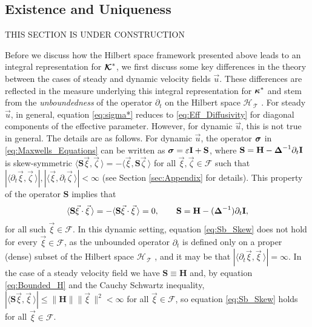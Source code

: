 \documentclass[11pt]{amsart}
\newcommand{\Hb}{\mathbf{H}}
\newcommand{\Ib}{\mathbf{I}}
\newcommand{\Sb}{\mathbf{S}}
\newcommand\Kbc{\mbox{\boldmath${\mathcal{K}}$}}
\newcommand{\Tc}{\mathcal{T}}
\newcommand{\Hs}{\mathscr{H}}
\newcommand{\Fs}{\mathscr{F}}
\newcommand\bsig{\mbox{\boldmath${\sigma}$}}
\newcommand\bDelta{\mbox{\boldmath${\Delta}$}}
\newcommand\bkappa{\mbox{\boldmath${\kappa}$}}
\begin{document}
\subsection{Existence and Uniqueness}\label{sec:Existance!}
%
THIS SECTION IS UNDER CONSTRUCTION

Before we discuss how the Hilbert space framework presented above
leads to an  integral representation for $\Kbc^*$, we first discuss
some key differences in the theory between the cases of steady 
and dynamic velocity fields $\vec{u}$. These differences are reflected
in the measure underlying this integral representation for $\bkappa^*$
and stem from the \emph{unboundedness} of the operator $\partial_t$ on the
Hilbert space $\Hs_{\,\Tc}$ \cite{Reed-1980,Stone:64}. For steady
$\vec{u}$, in general, equation \eqref{eq:sigma*} reduces to
\eqref{eq:Eff_Diffusivity} for  diagonal components of the effective
parameter.  However, for dynamic $\vec{u}$, this is not true in
general. The details are as follows. For dynamic $\vec{u}$, the
operator $\bsig$ in \eqref{eq:Maxwells_Equations} can be written as
$\bsig=\varepsilon\Ib+\Sb$, where  $\Sb=\Hb-\bDelta^{-1}\partial_t\Ib$ is skew-symmetric 
$\langle\Sb\vec{\xi},\vec{\zeta}\,\rangle=-\langle\vec{\xi},\Sb\vec{\zeta}\,\rangle$ for all
$\vec{\xi},\vec{\zeta}\in\Fs$ such that
$|\langle\partial_t\vec{\xi},\vec{\zeta}\,\rangle|,|\langle\vec{\xi},\partial_t\vec{\zeta}\,\rangle|<\infty$ (see Section
\ref{sec:Appendix} for details).  
This property of the operator $\Sb$ implies that
%
\begin{align}\label{eq:Sb_Skew_2}
  \langle\Sb\vec{\xi}\cdot\vec{\xi}\,\rangle=-\langle\Sb\vec{\xi}\cdot\vec{\xi}\,\rangle=0,
  \qquad
  \Sb=\Hb-(\bDelta^{-1})\partial_t\Ib,
\end{align}
%
for all such $\vec{\xi}\in\Fs$. In this dynamic setting, equation
\eqref{eq:Sb_Skew} does not hold for every $\vec{\xi}\in\Fs$, as the
unbounded operator $\partial_t$ is defined only on a proper (dense) subset of
the Hilbert space $\Hs_{\,\Tc}$ \cite{Reed-1980}, and it may be that
$|\langle\partial_t\vec{\xi},\vec{\xi}\,\rangle|=\infty$. In the case of a steady velocity field
we have $\Sb\equiv\Hb$ and, by equation \eqref{eq:Bounded_H} and the Cauchy
Schwartz inequality, $|\langle\Sb\vec{\xi},\vec{\xi}\,\rangle|\leq\|\Hb\|\|\vec{\xi}\,\|^2<\infty$ for
all $\vec{\xi}\in\Fs$, so equation \eqref{eq:Sb_Skew} holds for all
$\vec{\xi}\in\Fs$.   
\end{document}
